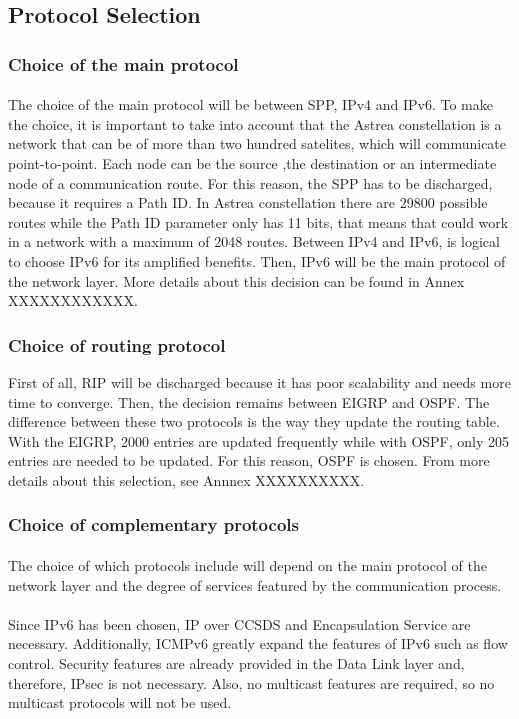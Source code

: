 \subsection{Protocol Selection}
\subsubsection{Choice of the main protocol}
\paragraph{}The choice of the main protocol will be between SPP, IPv4 and IPv6. To make the choice, it is important to take into account that the Astrea constellation is a network that can be of more than two hundred satelites, which will communicate point-to-point. Each node can be the source ,the destination or an intermediate node of a communication route.
For this reason, the SPP has to be discharged, because it requires a Path ID. In Astrea constellation there are 29800 possible routes while the Path ID parameter only has 11 bits, that means that could work in a network with a maximum of 2048 routes. Between IPv4 and IPv6, is logical to choose IPv6 for its amplified benefits. Then, IPv6 will be the main protocol of the network layer. More details about this decision can be found in Annex XXXXXXXXXXXX. 
\subsubsection{Choice of routing protocol}
First of all, RIP will be discharged because it has poor scalability and needs more time to converge. Then, the decision remains between EIGRP and OSPF. The difference between these two protocols is the way they update the routing table. With the EIGRP, 2000 entries are updated frequently while with OSPF, only 205 entries are needed to be updated. For this reason, OSPF is chosen. From more details about this selection, see Annnex XXXXXXXXXX.
\subsubsection{Choice of complementary protocols}
\paragraph{}The choice of which protocols include will depend on the main protocol of the network layer and the degree of services featured by the communication process.
\paragraph{}Since IPv6 has been chosen, IP over CCSDS and Encapsulation Service are necessary. Additionally, ICMPv6 greatly expand the features of IPv6 such as flow control. Security features are already provided in the Data Link layer and, therefore, IPsec is not necessary. Also, no multicast features are required, so no multicast protocols will not be used.

